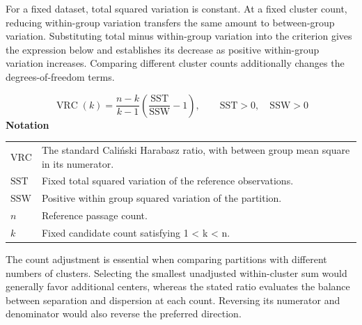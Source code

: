\documentclass[10pt,letterpaper]{article}
\newcommand{\notlabel}{\noindent\textbf{Notation}\par\nobreak\vspace{4pt}}
\begin{document}
For a fixed dataset, total squared variation is constant. At a fixed cluster count, reducing within-group variation transfers the same amount to between-group variation. Substituting total minus within-group variation into the criterion gives the expression below and establishes its decrease as positive within-group variation increases. Comparing different cluster counts additionally changes the degrees-of-freedom terms.\par

\par\noindent\begin{minipage}{\linewidth}
\begin{equation}\label{eq:vrcdirection}
\operatorname{VRC}(k)=\frac{n-k}{k-1}\left(\frac{\mathrm{SST}}{\mathrm{SSW}}-1\right),\qquad\mathrm{SST}>0,\quad\mathrm{SSW}>0
\end{equation}
\notlabel
{\fontsize{8.5}{10.5}\selectfont\setlength{\tabcolsep}{0pt}\renewcommand{\arraystretch}{1.12}
\begin{tabularx}{\linewidth}{@{}p{.14\linewidth}X@{}}
$\mathrm{VRC}$ & The standard Caliński Harabasz ratio, with between group mean square in its numerator.\\
$\mathrm{SST}$ & Fixed total squared variation of the reference observations.\\
$\mathrm{SSW}$ & Positive within group squared variation of the partition.\\
$n$ & Reference passage count.\\
$k$ & Fixed candidate count satisfying 1 < k < n.\\
\end{tabularx}}
\par\vspace{2pt}
\end{minipage}\par
The count adjustment is essential when comparing partitions with different numbers of clusters. Selecting the smallest unadjusted within-cluster sum would generally favor additional centers, whereas the stated ratio evaluates the balance between separation and dispersion at each count. Reversing its numerator and denominator would also reverse the preferred direction.\par
\end{document}
